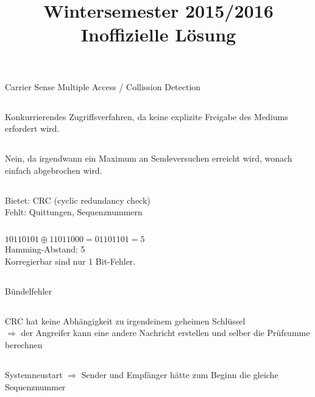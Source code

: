 \documentclass[a4paper]{article}
\title{Wintersemester 2015/2016 Inoffizielle Lösung}
\begin{document}
\section{}
\subsection{}
Carrier Sense Multiple Access / Collission Detection
\subsection{}
Konkurrierendes Zugriffsverfahren, da keine explizite Freigabe des Mediums erfordert wird.
\subsection{}
Nein, da irgendwann ein Maximum an Sendeversuchen erreicht wird, wonach einfach abgebrochen wird.
\subsection{}
Bietet: CRC (cyclic redundancy check)\\
Fehlt: Quittungen, Sequenznummern
\subsection{}
\subsection{}
$10110101 \oplus 11011000 = 01101101 = 5$\\
Hamming-Abstand: 5\\
Korregierbar sind nur 1 Bit-Fehler.
\subsection{}
Bündelfehler
\subsection{}
CRC hat keine Abhängigkeit zu irgendeinem geheimen Schlüssel\\ 
$\Rightarrow$ der Angreifer kann eine andere Nachricht erstellen und selber die Prüfsumme berechnen
\subsection{}
Systemneustart $\Rightarrow$ Sender und Empfänger hätte zum Beginn die gleiche Sequenznummer
\pagebreak
\section{}
\end{document}
